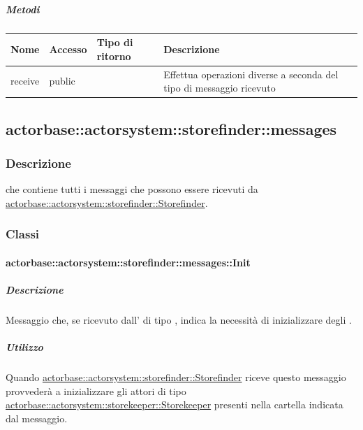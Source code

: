 \documentclass{scalatekids-article}
\begin{document}
\subparagraph{Metodi}

\begin{tabular}{| l | l | l | l |}
  \hline
  Nome & Accesso & Tipo di ritorno & Descrizione\\
  \hline
  receive & public &  & Effettua operazioni diverse a seconda del tipo di messaggio ricevuto\\
  \hline
\end{tabular}

\subsection{actorbase::actorsystem::storefinder::messages}
\label{sec:actorbase::actorsystem::storefinder::messages}

\subsubsection{Descrizione}

 che contiene tutti i messaggi che possono essere ricevuti da
\hyperref[sec:actorbase::actorsystem::storefinder::Storefinder]{actorbase::actorsystem::storefinder::Storefinder}.

\subsubsection{Classi}

\paragraph{actorbase::actorsystem::storefinder::messages::Init} %
\label{sec:actorbase::actorsystem::storefinder::messages::Init}

\subparagraph{Descrizione}

Messaggio che, se ricevuto dall' di tipo ,
indica la necessità di inizializzare degli .

\subparagraph{Utilizzo}

Quando \hyperref[sec:actorbase::actorsystem::storefinder::Storefinder]{actorbase::\allowbreak{}actorsystem::\allowbreak{}storefinder::\allowbreak{}Storefinder}
riceve questo messaggio provvederà a inizializzare gli attori di tipo
\hyperref[sec:actorbase::actorsystem::storekeeper::Storekeeper]{actorbase::\allowbreak{}actorsystem::\allowbreak{}storekeeper::\allowbreak{}Storekeeper}
presenti nella cartella indicata dal messaggio.
\end{document}
